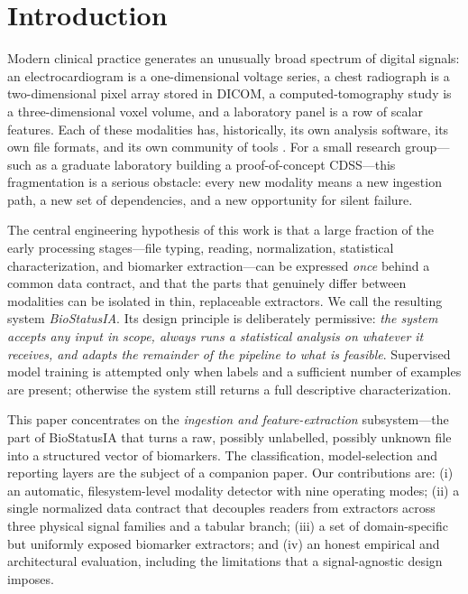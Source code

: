 \documentclass[10pt,twocolumn]{article}
\begin{document}
\section{Introduction}
Modern clinical practice generates an unusually broad spectrum of digital
signals: an electrocardiogram is a one-dimensional voltage series, a chest
radiograph is a two-dimensional pixel array stored in DICOM, a computed-tomography
study is a three-dimensional voxel volume, and a laboratory panel is a row of
scalar features. Each of these modalities has, historically, its own analysis
software, its own file formats, and its own community of tools
\cite{gramfort2013,mason2011pydicom,brett2020nibabel}. For a small research
group---such as a graduate laboratory building a proof-of-concept CDSS---this
fragmentation is a serious obstacle: every new modality means a new ingestion
path, a new set of dependencies, and a new opportunity for silent failure.

The central engineering hypothesis of this work is that a large fraction of the
early processing stages---file typing, reading, normalization, statistical
characterization, and biomarker extraction---can be expressed \emph{once} behind
a common data contract, and that the parts that genuinely differ between
modalities can be isolated in thin, replaceable extractors. We call the
resulting system \emph{BioStatusIA}. Its design principle is deliberately
permissive: \emph{the system accepts any input in scope, always runs a
statistical analysis on whatever it receives, and adapts the remainder of the
pipeline to what is feasible}. Supervised model training is attempted only when
labels and a sufficient number of examples are present; otherwise the system
still returns a full descriptive characterization.

This paper concentrates on the \emph{ingestion and feature-extraction}
subsystem---the part of BioStatusIA that turns a raw, possibly unlabelled,
possibly unknown file into a structured vector of biomarkers. The
classification, model-selection and reporting layers are the subject of a
companion paper. Our contributions are: (i) an automatic, filesystem-level
modality detector with nine operating modes; (ii) a single normalized data
contract that decouples readers from extractors across three physical signal
families and a tabular branch; (iii) a set of domain-specific but uniformly
exposed biomarker extractors; and (iv) an honest empirical and architectural
evaluation, including the limitations that a signal-agnostic design imposes.
\end{document}
